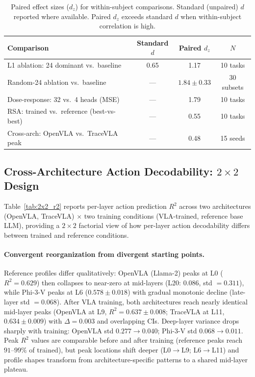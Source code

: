 \begin{table}[h]
\centering
\caption{Paired effect sizes ($d_z$) for within-subject comparisons. Standard (unpaired) $d$ reported where available. Paired $d_z$ exceeds standard $d$ when within-subject correlation is high.}
\label{tab:paired_dz}
\small
\begin{tabular}{lccc}
\toprule
\textbf{Comparison} & \textbf{Standard $d$} & \textbf{Paired $d_z$} & \textbf{$N$} \\
\midrule
L1 ablation: 24 dominant vs.\ baseline & 0.65 & 1.17 & 10 tasks \\
Random-24 ablation vs.\ baseline & --- & $1.84 \pm 0.33$ & 30 subsets \\
Dose-response: 32 vs.\ 4 heads (MSE) & --- & 1.79 & 10 tasks \\
RSA: trained vs.\ reference (best-vs-best) & --- & 0.55 & 10 tasks \\
Cross-arch: OpenVLA vs.\ TraceVLA peak & --- & 0.48 & 15 seeds \\
\bottomrule
\end{tabular}
\end{table}

\subsection{Cross-Architecture Action Decodability: $2 \times 2$ Design}
\label{sec:cross_arch_r2}

Table~\ref{tab:2x2_r2} reports per-layer action prediction $R^2$ across two architectures (OpenVLA, TraceVLA) $\times$ two training conditions (VLA-trained, reference base LLM), providing a $2 \times 2$ factorial view of how per-layer action decodability differs between trained and reference conditions.

\paragraph{Convergent reorganization from divergent starting points.}
Reference profiles differ qualitatively: OpenVLA (Llama-2) peaks at L0 ($R^2 = 0.629$) then collapses to near-zero at mid-layers (L20: $0.086$, std $= 0.311$), while Phi-3-V peaks at L6 ($0.578 \pm 0.018$) with gradual monotonic decline (late-layer std $= 0.068$).
After VLA training, both architectures reach nearly identical mid-layer peaks (OpenVLA at L9, $R^2 = 0.637 \pm 0.008$; TraceVLA at L11, $0.634 \pm 0.009$) with $\Delta = 0.003$ and overlapping CIs.
Deep-layer variance drops sharply with training: OpenVLA std $0.277 \to 0.040$; Phi-3-V std $0.068 \to 0.011$.
Peak $R^2$ values are comparable before and after training (reference peaks reach $91$--$99\%$ of trained), but peak locations shift deeper (L0$\to$L9; L6$\to$L11) and profile shapes transform from architecture-specific patterns to a shared mid-layer plateau.

